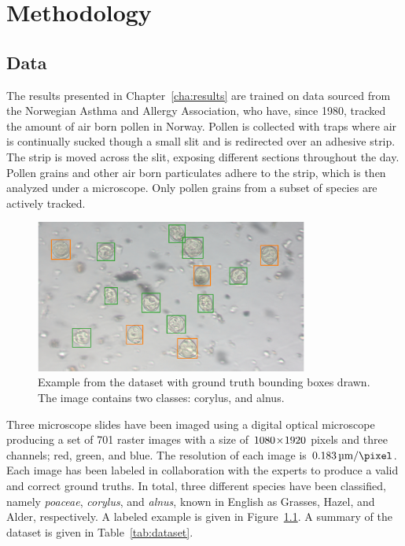 \chapter{Methodology}\label{cha:method}

\section{Data}\label{sec:dataset}
The results presented in Chapter~\ref{cha:results} are trained on data sourced from the Norwegian Asthma and Allergy Association, who have, since 1980, tracked the amount of air born pollen in Norway.
Pollen is collected with traps where air is continually sucked though a small slit and is redirected over an adhesive strip.
The strip is moved across the slit, exposing different sections throughout the day.
Pollen grains and other air born particulates adhere to the strip, which is then analyzed under a microscope.
Only pollen grains from a subset of species are actively tracked.

\begin{figure}[htbp]
  \centering
  \includegraphics[width=0.8\textwidth]{figs/method/Snap-057.png}
  \caption[Dataset example]{Example from the dataset with ground truth bounding boxes drawn.
The image contains two classes: \textcolor{corylus}{corylus}, and \textcolor{alnus}{alnus}.}\label{fig:dataset-sample}
\end{figure}

Three microscope slides have been imaged using a digital optical microscope producing a set of 701 raster images with a size of \(1080\!\times \! 1920\) pixels and three channels; red, green, and blue.
The resolution of each image is \(\SI{0.183}{\micro\metre\per\pixel}\).
Each image has been labeled in collaboration with the experts to produce a valid and correct ground truths.
In total, three different species have been classified, namely \textit{poaceae}, \textit{corylus}, and \textit{alnus}, known in English as Grasses, Hazel, and Alder, respectively.
A labeled example is given in Figure~\ref{fig:dataset-sample}.
A summary of the dataset is given in Table~\ref{tab:dataset}.

